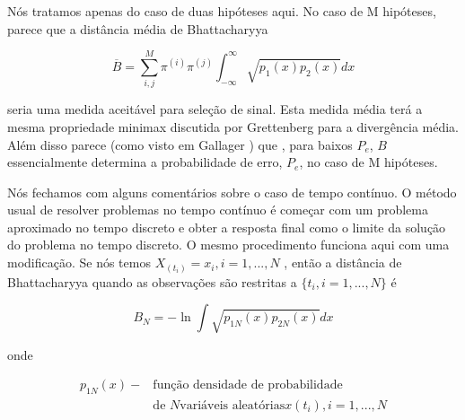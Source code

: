 \documentclass{sbrt2017port}
\begin{document}
Nós tratamos apenas do caso de duas hipóteses aqui. No caso de M hipóteses, parece que a distância média de Bhattacharyya

\begin{equation*}
	\overline{B} = \sum_{i,j}^{M} \pi^{(i)}\pi^{(j)} \int_{-\infty}^{\infty} \sqrt{p_1(x)p_2(x)} dx
\end{equation*}

seria uma medida aceitável para seleção de sinal. Esta medida média terá a mesma propriedade minimax  discutida por Grettenberg \cite{r10} para a divergência média. Além disso parece (como visto em Gallager \cite{r25}) que , para baixos $P_e$, $B$ essencialmente determina a probabilidade de erro, $P_e$, no caso de M hipóteses.
 
Nós fechamos com alguns comentários sobre o caso de tempo contínuo. O método usual de resolver problemas no tempo contínuo é começar com um problema aproximado no tempo discreto e obter a resposta final como o limite da solução do problema no tempo discreto. O mesmo procedimento funciona aqui com uma modificação. Se nós temos $X_{(t_i)} = x_i, i = 1,...,N $ , então a distância de Bhattacharyya quando as observações são restritas a $ \{ t_i, i = 1, ..., N\}$ é

\begin{equation}
	B_N = -\ln \int \sqrt{p_{1N}(x)p_{2N}(x)}dx
	\label{eq74}
\end{equation}

onde

\begin{equation} \label{eq75}
	\begin{split}
		p_{1N}(x) - &\text{função densidade de probabilidade} \\
		& \text{de } N \text{variáveis aleatórias} x(t_i), i = 1,...,N
	\end{split}
\end{equation}
\end{document}
